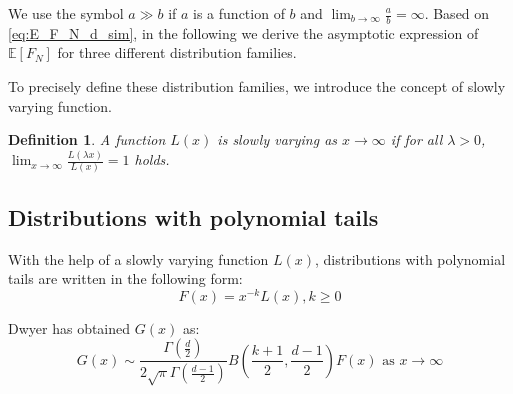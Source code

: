 \documentclass[conference,a4paper]{IEEEtran}
\def\E{\mathbb{E}}
\newtheorem{definition}{Definition}
\begin{document}
We use the symbol $a \gg b$ if $a$ is a function of $b$ and $\lim_{b\to \infty} \frac{a}{b} = \infty$.
Based on \eqref{eq:E_F_N_d_sim}, in the following
we derive the asymptotic expression of $\E[F_N]$
for three different distribution families.

To precisely define these distribution families, we introduce the concept of slowly varying function.
\begin{definition}
A function $L(x)$ is
slowly varying as $x\to \infty$
if for all $\lambda>0$,
$\lim_{x\to\infty}\frac{L(\lambda x)}{L(x)}=1$
holds.
\end{definition}

\subsection{Distributions with polynomial tails}

With the help of a slowly varying function $L(x)$,
distributions with polynomial tails are written
in the following form:
\begin{equation}\label{eq:F_poly_tail}
     F(x) = x^{-k} L(x), k\geq 0
\end{equation}

Dwyer\cite{dwyer1991convex} has obtained $G(x)$ as:
\begin{equation}\label{eq:g_poly_tail}
     G(x) \sim \frac{\Gamma(\frac{d}{2})}{2\sqrt{\pi} \Gamma(\frac{d-1}{2})}
     B\left(\frac{k+1}{2}, \frac{d-1}{2}\right) F(x)  \textrm{ as } x\to \infty
\end{equation}
\end{document}

